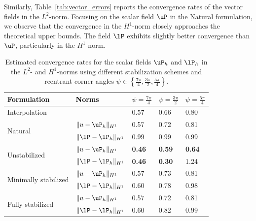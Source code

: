 Similarly, Table~\ref{tab:vector_errors} reports the convergence rates of the vector fields in the $ L^{2} $-norm.
Focusing on the scalar field $ \uP $ in the Natural formulation, we observe that the convergence in the $ H^1 $-norm closely approaches the theoretical upper bounds. The field $ \lP $ exhibits slightly better convergence than $ \uP $, particularly in the $ H^1 $-norm.
\begin{table}[h!]
	\centering
	\caption{Estimated convergence rates for the scalar fields $ \uP_h $ and $ \lP_h $ in the $ L^2 $- and $ H^1 $-norms using different stabilization schemes and reentrant corner angles $ \psi \in \left\{ \frac{7\pi}{4}, \frac{3\pi}{2}, \frac{5\pi}{4} \right\} $.}
	\begin{tabular}{l l l l l}
		\toprule
		Formulation & Norms & $\psi = \frac{7\pi}{4}$ & $\psi = \frac{3\pi}{2}$ & $\psi = \frac{5\pi}{4}$ \\ [2pt]
		\hline
		Interpolation                   &  & 0.57 & 0.66 & 0.80 \\  
		\hline
		\multirow{2}{*}{Natural}		& $\|u-\uP_{h}\|_{H^{1}}$ & 0.57 & 0.72  & 0.81 \\
		                                 & $\|\lP-\lP_{h}\|_{H^{1}}$ & 0.99  & 0.99 & 0.99  \\
		\hline
		\multirow{2}{*}{Unstabilized}    & $\|u-\uP_{h}\|_{H^{1}}$ & \textbf{0.46} & \textbf{0.59} & \textbf{0.64} \\
		                                 & $\|\lP-\lP_{h}\|_{H^{1}}$ & \textbf{0.46} & \textbf{0.30} & 1.24 \\
		\hline
		\multirow{2}{*}{Minimally stabilized} & $\|u-\uP_{h}\|_{H^{1}}$ & 0.57 & 0.73 & 0.81 \\
		& $\|\lP-\lP_{h}\|_{H^{1}}$ & 0.60 & 0.78 & 0.98 \\
		\hline
		\multirow{2}{*}{Fully stabilized} & $\|u-\uP_{h}\|_{H^{1}}$ & 0.57 & 0.72 & 0.81 \\
		& $\|\lP-\lP_{h}\|_{H^{1}}$ & 0.60 & 0.82 & 0.99 \\
		\bottomrule
	\end{tabular}
	\label{tab:scalar_errors}
\end{table}

